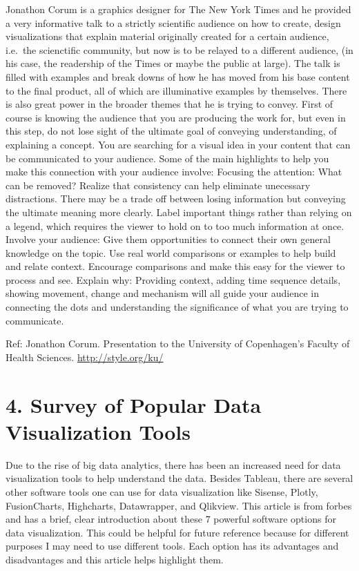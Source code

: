 \documentclass[]{book}
\theoremstyle{definition}
\theoremstyle{definition}
\theoremstyle{definition}
\theoremstyle{remark}
\begin{document}
Jonathon Corum is a graphics designer for The New York Times and he
provided a very informative talk to a strictly scientific audience on
how to create, design visualizations that explain material originally
created for a certain audience, i.e.~the scienctific community, but now
is to be relayed to a different audience, (in his case, the readership
of the Times or maybe the public at large). The talk is filled with
examples and break downs of how he has moved from his base content to
the final product, all of which are illuminative examples by themselves.
There is also great power in the broader themes that he is trying to
convey. First of course is knowing the audience that you are producing
the work for, but even in this step, do not lose sight of the ultimate
goal of conveying understanding, of explaining a concept. You are
searching for a visual idea in your content that can be communicated to
your audience. Some of the main highlights to help you make this
connection with your audience involve: Focusing the attention: What can
be removed? Realize that consistency can help eliminate unecessary
distractions. There may be a trade off between losing information but
conveying the ultimate meaning more clearly. Label important things
rather than relying on a legend, which requires the viewer to hold on to
too much information at once. Involve your audience: Give them
opportunities to connect their own general knowledge on the topic. Use
real world comparisons or examples to help build and relate context.
Encourage comparisons and make this easy for the viewer to process and
see. Explain why: Providing context, adding time sequence details,
showing movement, change and mechanism will all guide your audience in
connecting the dots and understanding the significance of what you are
trying to communicate.

Ref: Jonathon Corum. Presentation to the University of Copenhagen's
Faculty of Health Sciences. \url{http://style.org/ku/}

\section{4. Survey of Popular Data Visualization
Tools}\label{survey-of-popular-data-visualization-tools}

Due to the rise of big data analytics, there has been an increased need
for data visualization tools to help understand the data. Besides
Tableau, there are several other software tools one can use for data
visualization like Sisense, Plotly, FusionCharts, Highcharts,
Datawrapper, and Qlikview. This article is from forbes and has a brief,
clear introduction about these 7 powerful software options for data
visualization. This could be helpful for future reference because for
different purposes I may need to use different tools. Each option has
its advantages and disadvantages and this article helps highlight them.
\end{document}
